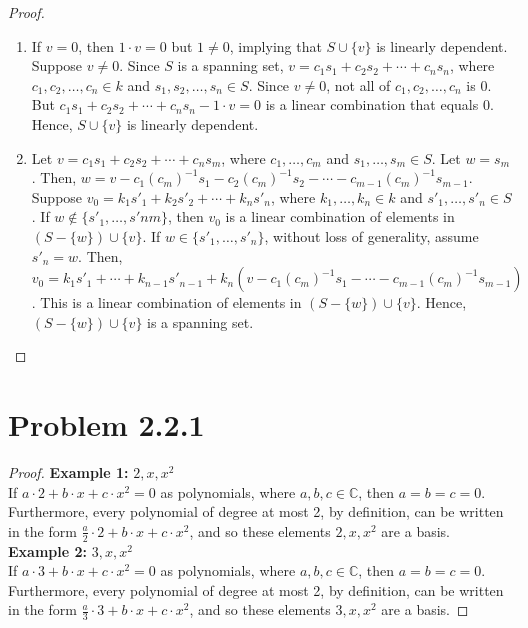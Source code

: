 \documentclass[12pt]{article}
\begin{document}
\begin{proof}
\begin{enumerate}
    \item If $v=0$, then $1 \cdot v = 0$ but $1 \neq 0$, implying that $S \cup \{v\}$ is linearly dependent. Suppose $v \neq 0$. Since $S$ is a spanning set, $v = c_1s_1 + c_2s_2 + \cdots + c_ns_n$, where $c_1, c_2, \ldots, c_n \in k$ and $s_1, s_2, \ldots, s_n \in S$. Since $v \neq 0$, not all of $c_1, c_2, \ldots, c_n$ is $0$. But $c_1s_1 + c_2s_2 + \cdots + c_ns_n - 1 \cdot v = 0$ is a linear combination that equals $0$. Hence, $S \cup \{v\}$ is linearly dependent.
    \item Let $v = c_1s_1 + c_2s_2 + \cdots + c_ns_m$, where $c_1, \ldots, c_m$ and $s_1, \ldots, s_m \in S$. Let $w = s_m$. Then, $w = v - c_1(c_m)^{-1}s_1 - c_2(c_m)^{-1}s_2 - \cdots - c_{m-1}(c_m)^{-1}s_{m-1}$. Suppose $v_0 = k_1s'_1 + k_2s'_2 + \cdots + k_ns'_n$, where $k_1, \ldots, k_n \in k$ and $s'_1, \ldots, s'_n \in S$. If $w \not\in \{s'_1, \ldots, s'nm\}$, then $v_0$ is a linear combination of elements in $(S-\{w\}) \cup \{v\}$. If $w \in \{s'_1, \ldots, s'_n\}$, without loss of generality, assume $s'_n = w$. Then, $v_0 = k_1s'_1 + \cdots + k_{n-1}s'_{n-1} + k_n (v - c_1(c_m)^{-1}s_1 - \cdots - c_{m-1}(c_m)^{-1}s_{m-1})$. This is a linear combination of elements in $(S-\{w\}) \cup \{v\}$. Hence, $(S-\{w\}) \cup \{v\}$ is a spanning set.
\end{enumerate}
\end{proof}

\newpage

\section{Problem 2.2.1}

\begin{proof}
\textbf{Example 1:} $ 2, x, x^2$
\\ If $a \cdot 2 + b \cdot x + c \cdot x^2 = 0$ as polynomials, where $a,b,c \in \mathbb{C}$, then $a=b=c=0$. Furthermore, every polynomial of degree at most 2, by definition, can be written in the form $\frac{a}{2} \cdot 2 + b \cdot x + c \cdot x^2$, and so these elements $2,x,x^2$ are a basis.
\\
\textbf{Example 2:} $ 3, x, x^2$
\\ If $a \cdot 3 + b \cdot x + c \cdot x^2 = 0$ as polynomials, where $a,b,c \in \mathbb{C}$, then $a=b=c=0$. Furthermore, every polynomial of degree at most 2, by definition, can be written in the form $\frac{a}{3} \cdot 3 + b \cdot x + c \cdot x^2$, and so these elements $3,x,x^2$ are a basis.
\end{proof}
\end{document}
